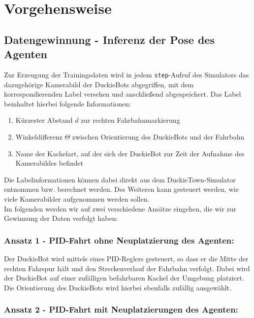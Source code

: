 
\chapter{Vorgehensweise}

\section{Datengewinnung - Inferenz der Pose des Agenten}
\label{collect-data}

Zur Erzeugung der Trainingsdaten wird in jedem \texttt{step}-Aufruf des Simulators das dazugehörige Kamerabild der DuckieBots abgegriffen, mit dem korrespondierenden Label versehen und anschließend abgespeichert. Das Label beinhaltet hierbei folgende Informationen:

\begin{enumerate}
	\item Kürzester Abstand $d$ zur rechten Fahrbahnmarkierung
	\item Winkeldifferenz $\Theta$ zwischen Orientierung des DuckieBots und der Fahrbahn
	\item Name der Kachelart, auf der sich der DuckieBot zur Zeit der Aufnahme des Kamerabildes befindet
\end{enumerate}

Die Labelinformationen können dabei direkt aus dem DuckieTown-Simulator entnommen bzw. berechnet werden. Des Weiteren kann gesteuert werden, wie viele Kamerabilder aufgenommen werden sollen. \\

Im folgenden werden wir auf zwei verschiedene Ansätze eingehen, die wir zur Gewinnung der Daten verfolgt haben:

\subsection{Ansatz 1 - PID-Fahrt ohne Neuplatzierung des Agenten:}

Der DuckieBot wird mittels eines PID-Reglers gesteuert, so dass er die Mitte der rechten Fahrspur hält und den Streckenverlauf der Fahrbahn verfolgt. Dabei wird der DuckieBot auf einer zufälligen befahrbaren Kachel der Umgebung platziert. Die Orientierung des DuckieBots  wird hierbei ebenfalls zufällig ausgewählt.

\subsection{Ansatz 2 - PID-Fahrt mit Neuplatzierungen des Agenten:}

